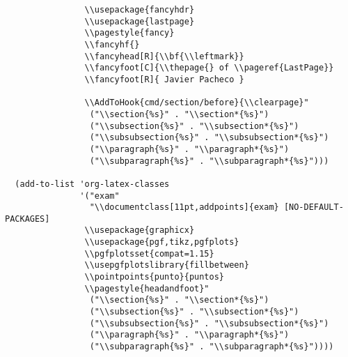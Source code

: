 \documentclass[11pt]{article}
\begin{document}
\begin{verbatim}
                \\usepackage{fancyhdr}
                \\usepackage{lastpage}
                \\pagestyle{fancy}
                \\fancyhf{}
                \\fancyhead[R]{\\bf{\\leftmark}}
                \\fancyfoot[C]{\\thepage{} of \\pageref{LastPage}}
                \\fancyfoot[R]{ Javier Pacheco }

                \\AddToHook{cmd/section/before}{\\clearpage}"
                 ("\\section{%s}" . "\\section*{%s}")
                 ("\\subsection{%s}" . "\\subsection*{%s}")
                 ("\\subsubsection{%s}" . "\\subsubsection*{%s}")
                 ("\\paragraph{%s}" . "\\paragraph*{%s}")
                 ("\\subparagraph{%s}" . "\\subparagraph*{%s}")))

  (add-to-list 'org-latex-classes
               '("exam"
                 "\\documentclass[11pt,addpoints]{exam} [NO-DEFAULT-PACKAGES]
                \\usepackage{graphicx}
                \\usepackage{pgf,tikz,pgfplots}
                \\pgfplotsset{compat=1.15}
                \\usepgfplotslibrary{fillbetween}
                \\pointpoints{punto}{puntos}
                \\pagestyle{headandfoot}"
                 ("\\section{%s}" . "\\section*{%s}")
                 ("\\subsection{%s}" . "\\subsection*{%s}")
                 ("\\subsubsection{%s}" . "\\subsubsection*{%s}")
                 ("\\paragraph{%s}" . "\\paragraph*{%s}")
                 ("\\subparagraph{%s}" . "\\subparagraph*{%s}"))))


\end{verbatim}
\end{document}
